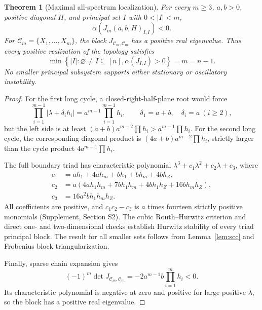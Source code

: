 \documentclass[11pt]{article}
\newtheorem{theorem}{Theorem}[section]
\theoremstyle{definition}
\newcommand{\1}{\mathbf 1}
\newcommand{\cC}{\mathcal C}
\newcommand{\alphaS}{\alpha}
\begin{document}
\begin{theorem}[Maximal all-spectrum localization]\label{thm:allspectrum}
For every $m\ge3$, $a,b>0$, positive diagonal $H$, and principal set $I$ with
$0<|I|<m$,
\begin{equation}\label{eq:lowerhurwitz}
 \alphaS(J_m(a,b,H)_{I,I})<0.
\end{equation}
For
$\cC_m=\{X_1,\ldots,X_m\}$, the block $J_{\cC_m,\cC_m}$ has a positive real
eigenvalue.  Thus every positive realization of the topology satisfies
\begin{equation}\label{eq:maxorder}
 \boxed{\min\left\{|I|:\varnothing\ne I\subseteq[n],
 \alphaS(J_{I,I})>0\right\}=m=n-1.}
\end{equation}
No smaller principal subsystem supports either stationary or oscillatory
instability.
\end{theorem}

\begin{proof}
For the first long cycle, a closed-right-half-plane root would force
\[
 \prod_{i=1}^{m-1}|\lambda+\delta_i h_i|
 =a^{m-1}\prod_{i=1}^{m-1}h_i,
 \qquad \delta_1=a+b,\quad\delta_i=a\ (i\ge2),
\]
but the left side is at least
$(a+b)a^{m-2}\prod h_i>a^{m-1}\prod h_i$.
For the second long cycle, the corresponding diagonal product is
$(4a+b)a^{m-2}\prod h_i$, strictly larger than the cycle product
$4a^{m-1}\prod h_i$.

The full boundary triad has characteristic polynomial
$\lambda^3+c_1\lambda^2+c_2\lambda+c_3$, where
\begin{align}
c_1&=ah_1+4ah_m+bh_1+bh_m+4bh_Z,\nonumber\\
c_2&=a(4ah_1h_m+7bh_1h_m+4bh_1h_Z+16bh_mh_Z),\label{eq:triad}\\
c_3&=16a^2bh_1h_mh_Z.\nonumber
\end{align}
All coefficients are positive, and $c_1c_2-c_3$ is $a$ times fourteen
strictly positive monomials (Supplement, Section S2).  The cubic
Routh--Hurwitz criterion and direct one- and two-dimensional checks establish
Hurwitz stability of every triad principal block.  The result for all smaller
sets follows from Lemma~\ref{lem:scc} and Frobenius block triangularization.

Finally, sparse chain expansion gives
\begin{equation}\label{eq:coreminor}
 (-1)^m\det J_{\cC_m,\cC_m}
 =-2a^{m-1}b\prod_{i=1}^m h_i<0.
\end{equation}
Its characteristic polynomial is negative at zero and positive for large
positive $\lambda$, so the block has a positive real eigenvalue.
\end{proof}
\end{document}
